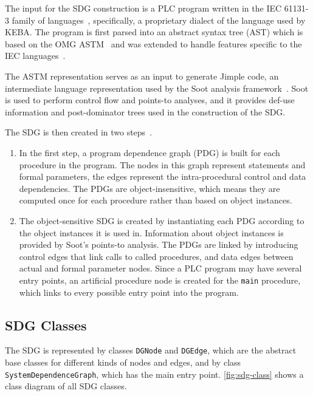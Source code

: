 The input for the SDG construction is a PLC program written in the IEC 61131-3 family of 
languages~\cite{IEC61131:2003}, specifically, a proprietary dialect of the language used by KEBA. The program is first 
parsed into an abstract syntax tree (AST) which is based on the OMG ASTM~\cite{ASTM} and was extended to handle 
features specific to the IEC languages~\cite[ch.~4]{GrimmerDA}. 

The ASTM representation serves as an input to generate Jimple code, an intermediate language representation used by the 
Soot analysis framework~\cite{Soot}. Soot is used to perform control flow and points-to analyses, and it provides 
def-use information and post-dominator trees used in the construction of the SDG.

The SDG is then created in two steps~\cite[ch.~6]{GrimmerDA}.

\begin{enumerate}
  \item In the first step, a program dependence graph (PDG) is built for each procedure in the program. The nodes in 
  this graph represent statements and formal parameters, the edges represent the intra-procedural control and data 
  dependencies. The PDGs are object-insensitive, which means they are computed once for each procedure rather than 
  based on object instances.
  
  \item The object-sensitive SDG is created by instantiating each PDG according to the object instances 
  it is used in. Information about object instances is provided by Soot's points-to analysis. The PDGs are linked by 
  introducing control edges that link calls to called procedures, and data edges between actual and formal parameter 
  nodes. Since a PLC program may have several entry points, an artificial procedure node is created for the 
  \lstinline|main| procedure, which links to every possible entry point into the program.
\end{enumerate}

\subsection{SDG Classes} \label{sec:classes}

The SDG is represented by classes \lstinline|DGNode| and \lstinline|DGEdge|, which are the abstract base classes for 
different kinds of nodes and edges, and by class \lstinline|SystemDependenceGraph|, which has the main entry point. 
\autoref{fig:sdg-class} shows a class diagram of all SDG classes.

